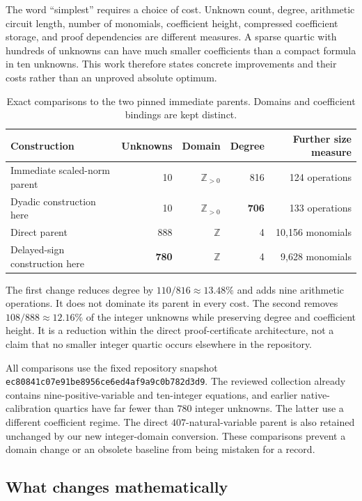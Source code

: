 \documentclass[11pt,letterpaper]{article}
\newcommand{\Z}{\mathbb Z}
\newcommand{\Pos}{\mathbb Z_{>0}}
\newcommand{\sha}{\texttt{ec80841c07e91be8956ce6ed4af9a9c0b782d3d9}}
\theoremstyle{definition}
\theoremstyle{remark}
\numberwithin{equation}{section}
\begin{document}
The word ``simplest'' requires a choice of cost. Unknown count, degree,
arithmetic circuit length, number of monomials, coefficient height,
compressed coefficient storage, and proof dependencies are different
measures. A sparse quartic with hundreds of unknowns can have much smaller
coefficients than a compact formula in ten unknowns. This work therefore
states concrete improvements and their costs rather than an unproved
absolute optimum.

\begin{table}[ht]
\centering\small
\begin{tabular}{@{}lrrrr@{}}
\toprule
Construction & Unknowns & Domain & Degree & Further size measure\\
\midrule
Immediate scaled-norm parent & 10 & $\Pos$ & 816 & 124 operations\\
Dyadic construction here & 10 & $\Pos$ & \textbf{706} & 133 operations\\
Direct parent & 888 & $\Z$ & 4 & 10,156 monomials\\
Delayed-sign construction here & \textbf{780} & $\Z$ & 4 & 9,628 monomials\\
\bottomrule
\end{tabular}
\caption{Exact comparisons to the two pinned immediate parents.
Domains and coefficient bindings are kept distinct.}
\label{tab:main}
\end{table}

The first change reduces degree by $110/816\approx13.48\%$ and adds nine
arithmetic operations. It does not dominate its parent in every cost.
The second removes $108/888\approx12.16\%$ of the integer unknowns while
preserving degree and coefficient height. It is a reduction within the
direct proof-certificate architecture, not a claim that no smaller
integer quartic occurs elsewhere in the repository.

All comparisons use the fixed repository snapshot\newline
\sha. The reviewed
collection already contains nine-positive-variable and ten-integer
equations, and earlier native-calibration quartics have far fewer than
$780$ integer unknowns. The latter use a different coefficient regime.
The direct $407$-natural-variable parent is also retained unchanged by
our new integer-domain conversion. These comparisons prevent a domain
change or an obsolete baseline from being mistaken for a record.

\subsection{What changes mathematically}
\end{document}
